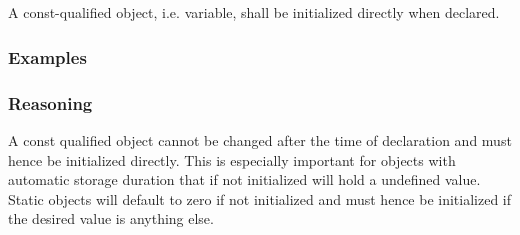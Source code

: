 \subsection*{\codingRule{}}

A const-qualified object, i.e. variable, shall be initialized directly when declared.

\subsubsection*{Examples}

\noindent
\begin{minipage}[t]{\codelstwidth\linewidth}
    
\end{minipage}
\hfill
\begin{minipage}[t]{\codelstwidth\linewidth}
    
\end{minipage}

\subsubsection*{Reasoning}

A const qualified object cannot be changed after the time of declaration and must hence be initialized directly. This is especially important for objects with automatic storage duration that if not initialized will hold a undefined value. Static objects will default to zero if not initialized and must hence be initialized if the desired value is anything else.
